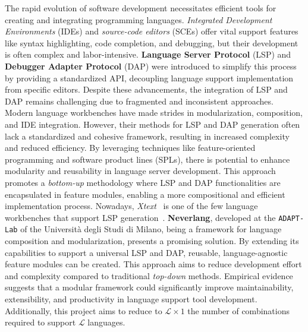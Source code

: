 The rapid evolution of software development necessitates efficient tools for creating and integrating programming languages. \textit{Integrated Development Environments} (IDEs) and \textit{source-code editors} (SCEs) offer vital support features like syntax highlighting, code completion, and debugging, but their development is often complex and labor-intensive. \textbf{Language Server Protocol} (LSP) and \textbf{Debugger Adapter Protocol} (DAP) were introduced to simplify this process by providing a standardized API, decoupling language support implementation from specific editors. Despite these advancements, the integration of LSP and DAP remains challenging due to fragmented and inconsistent approaches. Modern language workbenches have made strides in modularization, composition, and IDE integration. However, their methods for LSP and DAP generation often lack a standardized and cohesive framework, resulting in increased complexity and reduced efficiency. By leveraging techniques like feature-oriented programming and software product lines (SPLs), there is potential to enhance modularity and reusability in language server development. This approach promotes a \textit{bottom-up} methodology where LSP and DAP functionalities are encapsulated in feature modules, enabling a more compositional and efficient implementation process. Nowadays, \textit{Xtext}~\cite{Bettini13b} is one of the few language workbenches that support LSP generation~\cite{Barros22}. \textbf{Neverlang}, developed at the \texttt{ADAPT-Lab} of the Università degli Studi di Milano, being a framework for language composition and modularization, presents a promising solution. By extending its capabilities to support a universal LSP and DAP, reusable, language-agnostic feature modules can be created. This approach aims to reduce development effort and complexity compared to traditional \textit{top-down} methods. Empirical evidence suggests that a modular framework could significantly improve maintainability, extensibility, and productivity in language support tool development. Additionally, this project aims to reduce to $\mathcal{L}   \times 1$ the number of combinations required to support $\mathcal{L}$ languages.

